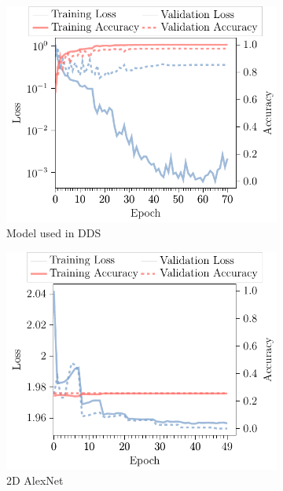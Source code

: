\begin{subappendices}
\begin{figure}
\begin{subfigure}[t]{\modelplotwidth}
    \centering
    \includegraphics[width=\textwidth]{Figures/Appendix/DDSNet_2D.pdf}
    \caption{Model used in \gls{DDS}}\label{fig:DDSNet2D}
\end{subfigure}
\begin{subfigure}[t]{\modelplotwidth}
    \centering
    \includegraphics[width=\textwidth]{Figures/Appendix/AlexNet_2D.pdf}
    \caption{2D AlexNet}\label{fig:AlexNet2D}
\end{subfigure}
\begin{subfigure}[t]{\modelplotwidth}

\end{subfigure}
\end{figure}
\end{subappendices}

